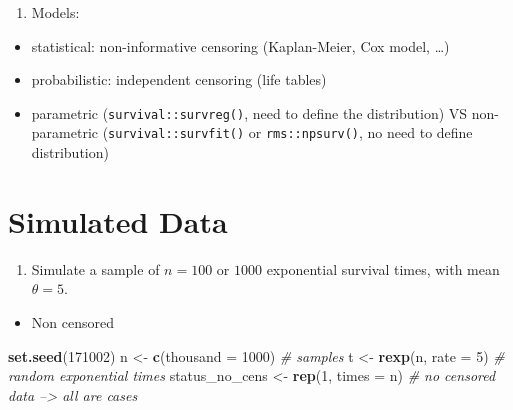 \documentclass[]{book}
\newenvironment{Shaded}{\begin{snugshade}}{\end{snugshade}}
\newcommand{\KeywordTok}[1]{\textcolor[rgb]{0.13,0.29,0.53}{\textbf{{#1}}}}
\newcommand{\DataTypeTok}[1]{\textcolor[rgb]{0.13,0.29,0.53}{{#1}}}
\newcommand{\DecValTok}[1]{\textcolor[rgb]{0.00,0.00,0.81}{{#1}}}
\newcommand{\StringTok}[1]{\textcolor[rgb]{0.31,0.60,0.02}{{#1}}}
\newcommand{\CommentTok}[1]{\textcolor[rgb]{0.56,0.35,0.01}{\textit{{#1}}}}
\newcommand{\NormalTok}[1]{{#1}}
\providecommand{\tightlist}{%
  \setlength{\itemsep}{0pt}\setlength{\parskip}{0pt}}
\theoremstyle{definition}
\theoremstyle{definition}
\theoremstyle{definition}
\theoremstyle{remark}
\begin{document}
\begin{enumerate}
\def\labelenumi{\arabic{enumi}.}
\setcounter{enumi}{3}
\tightlist
\item
  Models:
\end{enumerate}

\begin{itemize}
\tightlist
\item
  statistical: non-informative censoring (Kaplan-Meier, Cox model,
  \ldots{})
\item
  probabilistic: independent censoring (life tables)
\item
  parametric (\texttt{survival::survreg()}, need to define the
  distribution) VS non-parametric (\texttt{survival::survfit()} or
  \texttt{rms::npsurv()}, no need to define distribution)
\end{itemize}

\section{Simulated Data}\label{sumulation1}

\begin{enumerate}
\def\labelenumi{\arabic{enumi}.}
\tightlist
\item
  Simulate a sample of \(n = 100\) or \(1000\) exponential survival
  times, with mean \(\theta = 5\).
\end{enumerate}

\begin{itemize}
\tightlist
\item
  Non censored
\end{itemize}

\begin{Shaded}
\begin{Highlighting}[]
\KeywordTok{set.seed}\NormalTok{(}\DecValTok{171002}\NormalTok{)}
\NormalTok{n              <-}\StringTok{ }\KeywordTok{c}\NormalTok{(}\DataTypeTok{thousand =} \DecValTok{1000}\NormalTok{)                                   }\CommentTok{# samples}
\NormalTok{t              <-}\StringTok{ }\KeywordTok{rexp}\NormalTok{(n, }\DataTypeTok{rate =} \DecValTok{5}\NormalTok{)                   }\CommentTok{# random exponential times}
\NormalTok{status_no_cens <-}\StringTok{ }\KeywordTok{rep}\NormalTok{(}\DecValTok{1}\NormalTok{, }\DataTypeTok{times =} \NormalTok{n)         }\CommentTok{# no censored data --> all are cases}
\end{Highlighting}
\end{Shaded}
\end{document}
